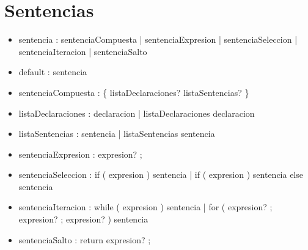 \section{Sentencias}

\begin{itemize}
\item sentencia : sentenciaCompuesta | sentenciaExpresion | sentenciaSeleccion | sentenciaIteracion | sentenciaSalto
\item default : sentencia
\item sentenciaCompuesta : \{ listaDeclaraciones? listaSentencias? \}
\item listaDeclaraciones : declaracion | listaDeclaraciones declaracion
\item listaSentencias : sentencia | listaSentencias sentencia
\item sentenciaExpresion : expresion? ;
\item sentenciaSeleccion : if ( expresion ) sentencia | if ( expresion ) sentencia else sentencia
\item sentenciaIteracion : while ( expresion ) sentencia | for ( expresion? ; expresion? ; expresion? ) sentencia
\item sentenciaSalto : return expresion? ;
\end{itemize}
